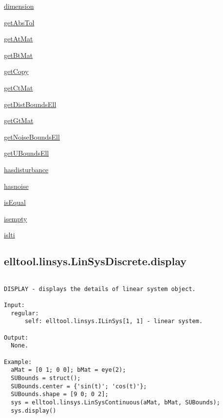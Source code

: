 \begin{list}{}{}
 \item \hyperref[method:elltool.linsys.ALinSys.dimension]{dimension}
 \item \hyperref[method:elltool.linsys.ALinSys.getAbsTol]{getAbsTol}
 \item \hyperref[method:elltool.linsys.ALinSys.getAtMat]{getAtMat}
 \item \hyperref[method:elltool.linsys.ALinSys.getBtMat]{getBtMat}
 \item \hyperref[method:elltool.linsys.ALinSys.getCopy]{getCopy}
 \item \hyperref[method:elltool.linsys.ALinSys.getCtMat]{getCtMat}
 \item \hyperref[method:elltool.linsys.ALinSys.getDistBoundsEll]{getDistBoundsEll}
 \item \hyperref[method:elltool.linsys.ALinSys.getGtMat]{getGtMat}
 \item \hyperref[method:elltool.linsys.ALinSys.getNoiseBoundsEll]{getNoiseBoundsEll}
 \item \hyperref[method:elltool.linsys.ALinSys.getUBoundsEll]{getUBoundsEll}
 \item \hyperref[method:elltool.linsys.ALinSys.hasdisturbance]{hasdisturbance}
 \item \hyperref[method:elltool.linsys.ALinSys.hasnoise]{hasnoise}
 \item \hyperref[method:elltool.linsys.ALinSys.isEqual]{isEqual}
 \item \hyperref[method:elltool.linsys.ALinSys.isempty]{isempty}
 \item \hyperref[method:elltool.linsys.ALinSys.islti]{islti}
\end{list}
\subsection{\texorpdfstring{elltool.linsys.LinSysDiscrete.display}{display}}\label{method:elltool.linsys.LinSysDiscrete.display}
\begin{verbatim}

DISPLAY - displays the details of linear system object.

Input:
  regular:
      self: elltool.linsys.ILinSys[1, 1] - linear system.

Output:
  None.

Example:
  aMat = [0 1; 0 0]; bMat = eye(2);
  SUBounds = struct();
  SUBounds.center = {'sin(t)'; 'cos(t)'};
  SUBounds.shape = [9 0; 0 2];
  sys = elltool.linsys.LinSysContinuous(aMat, bMat, SUBounds);
  sys.display()
\end{verbatim}
